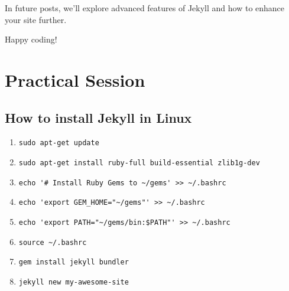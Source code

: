 \documentclass{book}
\begin{document}
In future posts, we'll explore advanced features of Jekyll and how to enhance your site further.

Happy coding!

\chapter*{Practical Session}


\section*{How to install Jekyll in Linux}
\begin{enumerate}
\item \begin{verbatim}
sudo apt-get update
\end{verbatim}
\item \begin{verbatim}
sudo apt-get install ruby-full build-essential zlib1g-dev
\end{verbatim}
\item \begin{verbatim}
echo '# Install Ruby Gems to ~/gems' >> ~/.bashrc
\end{verbatim}
\item \begin{verbatim}
echo 'export GEM_HOME="~/gems"' >> ~/.bashrc
\end{verbatim}
\item \begin{verbatim}
echo 'export PATH="~/gems/bin:$PATH"' >> ~/.bashrc
\end{verbatim}
\item \begin{verbatim}
source ~/.bashrc
\end{verbatim}
\item \begin{verbatim}
gem install jekyll bundler
\end{verbatim}
\item \begin{verbatim}
jekyll new my-awesome-site
\end{verbatim}
\end{enumerate}

\end{document}
